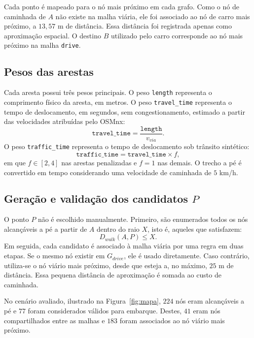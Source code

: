 \documentclass[conference]{IEEEtran}
\begin{document}
Cada ponto é mapeado para o nó mais próximo em cada grafo. Como o nó de caminhada de $A$ não existe na malha viária, ele foi associado ao nó de carro mais próximo, a $13{,}57$ m de distância. Essa distância foi registrada apenas como aproximação espacial. O destino $B$ utilizado pelo carro corresponde ao nó mais próximo na malha \texttt{drive}.

\subsection{Pesos das arestas}
Cada aresta possui três pesos principais. O peso \texttt{length} representa o comprimento físico da aresta, em metros. O peso \texttt{travel\_time} representa o tempo de deslocamento, em segundos, sem congestionamento, estimado a partir das velocidades atribuídas pelo OSMnx:
\begin{equation}
\texttt{travel\_time} = \frac{\texttt{length}}{v_{via}}.
\end{equation}
O peso \texttt{traffic\_time} representa o tempo de deslocamento sob trânsito sintético:
\begin{equation}
\texttt{traffic\_time} = \texttt{travel\_time} \times f,
\end{equation}
em que $f \in [2,4]$ nas arestas penalizadas e $f = 1$ nas demais. O trecho a pé é convertido em tempo considerando uma velocidade de caminhada de $5$ km/h.

\subsection{Geração e validação dos candidatos $P$}
O ponto $P$ não é escolhido manualmente. Primeiro, são enumerados todos os nós alcançáveis a pé a partir de $A$ dentro do raio $X$, isto é, aqueles que satisfazem:
\begin{equation}
D_{walk}(A,P) \leq X.
\end{equation}
Em seguida, cada candidato é associado à malha viária por uma regra em duas etapas. Se o mesmo nó existir em $G_{drive}$, ele é usado diretamente. Caso contrário, utiliza-se o nó viário mais próximo, desde que esteja a, no máximo, $25$ m de distância. Essa pequena distância de aproximação é somada ao custo de caminhada.

No cenário avaliado, ilustrado na Figura~\ref{fig:mapa}, $224$ nós eram alcançáveis a pé e $77$ foram considerados válidos para embarque. Destes, $41$ eram nós compartilhados entre as malhas e $183$ foram associados ao nó viário mais próximo.
\end{document}
